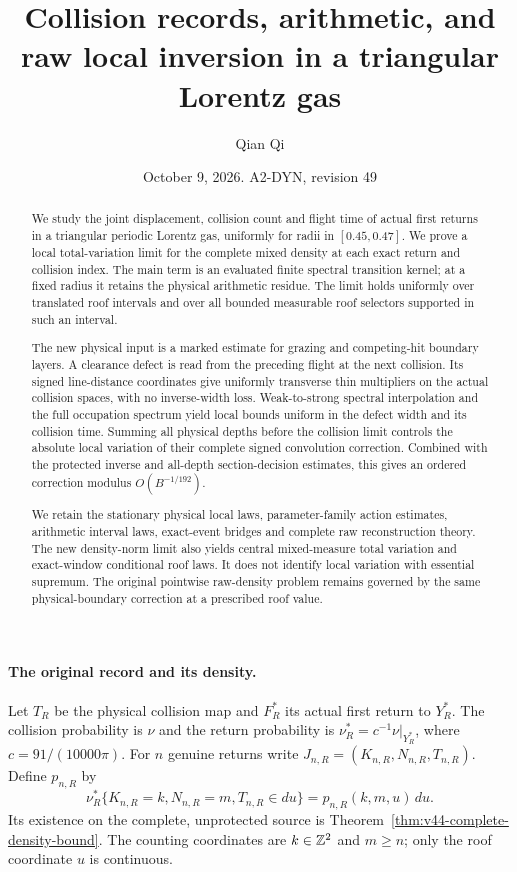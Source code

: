 \documentclass[11pt,reqno]{amsart}
\title[Collision records and raw local inversion]{Collision records, arithmetic, and raw local inversion in a triangular Lorentz gas}
\author{Qian Qi}
\date{October 9, 2026. A2-DYN, revision 49}
\numberwithin{equation}{section}
\theoremstyle{definition}\newtheorem{definition}[theorem]{Definition}
\theoremstyle{remark}\newtheorem{remark}[theorem]{Remark}
\begin{document}
\raggedbottom
\begin{abstract}
We study the joint displacement, collision count and flight time of
actual first returns in a triangular periodic Lorentz gas, uniformly
for radii in $[0.45,0.47]$. We prove a local total-variation limit for
the complete mixed density at each exact return and collision index.
The main term is an evaluated finite spectral transition kernel; at a
fixed radius it retains the physical arithmetic residue. The limit
holds uniformly over translated roof intervals and over all bounded
measurable roof selectors supported in such an interval.

The new physical input is a marked estimate for grazing and
competing-hit boundary layers. A clearance defect is read from the
preceding flight at the next collision. Its signed line-distance
coordinates give uniformly transverse thin multipliers on the actual
collision spaces, with no inverse-width loss. Weak-to-strong spectral
interpolation and the full occupation spectrum yield local bounds
uniform in the defect width and its collision time. Summing all
physical depths before the collision limit controls the absolute
local variation of their complete signed convolution correction.
Combined with the protected inverse and all-depth section-decision
estimates, this gives an ordered correction modulus $O(B^{-1/192})$.

We retain the stationary physical local laws, parameter-family action
estimates, arithmetic interval laws, exact-event bridges and complete
raw reconstruction theory. The new density-norm limit also yields
central mixed-measure total variation and exact-window conditional
roof laws. It does not identify local variation with essential
supremum. The original pointwise raw-density problem remains governed
by the same physical-boundary correction at a prescribed roof value.
\end{abstract}
\maketitle

\paragraph{The original record and its density.}
Let $T_R$ be the physical collision map and $F_R^*$ its actual first
return to $Y_R^*$. The collision probability is $\nu$ and the return
probability is $\nu_R^*=c^{-1}\nu|_{Y_R^*}$, where
$c=91/(10000\pi)$. For $n$ genuine returns write
$J_{n,R}=(K_{n,R},N_{n,R},T_{n,R})$. Define $p_{n,R}$ by
\[
 \nu_R^*\{K_{n,R}=k,N_{n,R}=m,T_{n,R}\in du\}
                  =p_{n,R}(k,m,u)\,du.
\]
Its existence on the complete, unprotected source is
Theorem~\ref{thm:v44-complete-density-bound}. The counting coordinates
are $k\in\mathbb Z^2$ and $m\ge n$; only the roof coordinate $u$ is continuous.
\end{document}
